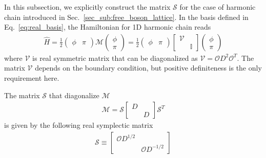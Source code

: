 In this subsection, we explicitly construct the matrix $\mathcal{S}$ for the case of harmonic chain introduced in Sec.~\ref{sec_sub:free_boson_lattice}. In the basis defined in Eq.~\eqref{eq:real_basis}, the Hamiltonian for 1D harmonic chain reads
\begin{equation}\begin{aligned}
\hat{H}
=\frac{1}{2}
\begin{pmatrix}
\phi & \pi
\end{pmatrix}
\mathcal{M}
\begin{pmatrix}
\phi\\
\pi
\end{pmatrix}
=\frac{1}{2}
\begin{pmatrix}
\phi & \pi
\end{pmatrix}
\begin{bmatrix}
\mathcal{V} \\
& {\mathbb{ I}}
\end{bmatrix}
\begin{pmatrix}
\phi\\
\pi
\end{pmatrix}
\end{aligned}\end{equation}
where $\mathcal{V}$ is real symmetric matrix that can be diagonalized as $\mathcal{V}=\mathcal{O}D^2\mathcal{O}^T$. The matrix $\mathcal{V}$ depends on the boundary condition, but positive definiteness is the only requirement here. 

The matrix $\mathcal{S}$ that diagonalize $\mathcal{M}$
\begin{equation}
\begin{aligned}
\mathcal{M}=\mathcal{S}
\begin{bmatrix}
D \\ 
& D
\end{bmatrix}
\mathcal{S}^T
\end{aligned}
\end{equation}
is given by the following real symplectic matrix
\begin{equation}\begin{aligned}
\mathcal{S}\equiv
\begin{bmatrix}
\mathcal{O}D^{1/2} \\
& \mathcal{O}D^{-1/2}
\end{bmatrix}
\end{aligned}\end{equation}


